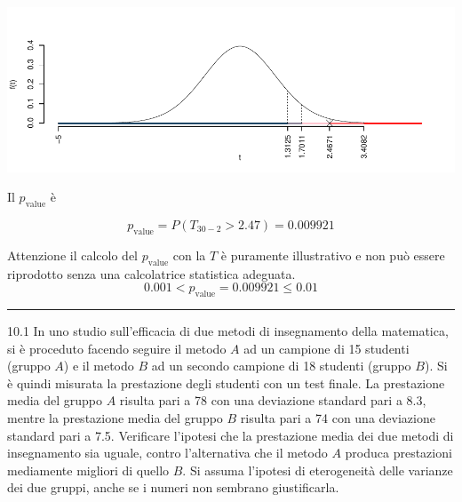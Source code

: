 \documentclass[
  11pt,
]{book}
\theoremstyle{mytheoremstyle}
\theoremstyle{mydefstyle}
\newenvironment{sol}
  {
  \begin{tcolorbox}[enhanced,breakable,arc=0.1mm,boxrule=1pt,colback=white,colframe=iblue,
  title=\bf \fontfamily{lmss}\selectfont \hspace{.5 cm} Soluzione,drop fuzzy shadow]

}{
\end{tcolorbox}
  }
\begin{document}
\begin{sol}
\begin{center}\includegraphics{Esami_passati_con_soluzioni_files/figure-latex/05-test-13,-1} \end{center}

Il \(p_{\text{value}}\) è

\[ p_{\text{value}} = P(T_{30-2}>2.47)=0.009921 \]

Attenzione il calcolo del \(p_\text{value}\) con la \(T\) è puramente illustrativo e non può essere riprodotto senza una calcolatrice statistica adeguata.\[
 0.001 < p_\text{value}= 0.009921 \leq 0.01 
\]

\end{sol}

\begin{center}\rule{0.5\linewidth}{0.5pt}\end{center}

10.1 In uno studio sull'efficacia di due metodi di insegnamento della matematica, si è proceduto facendo seguire il metodo \(A\) ad un campione di 15 studenti (gruppo \(A\)) e il metodo \(B\) ad un secondo campione di 18 studenti (gruppo \(B\)). Si è quindi misurata la prestazione degli studenti con un test finale. La prestazione media del gruppo \(A\) risulta pari a 78 con una deviazione standard pari a 8.3, mentre la prestazione media del gruppo \(B\) risulta pari a 74 con una deviazione standard pari a 7.5. Verificare l'ipotesi che la prestazione media dei due metodi di insegnamento sia uguale, contro l'alternativa che il metodo \(A\) produca prestazioni mediamente migliori di quello \(B\). Si assuma l'ipotesi di eterogeneità delle varianze dei due gruppi, anche se i numeri non sembrano giustificarla.
\end{document}
